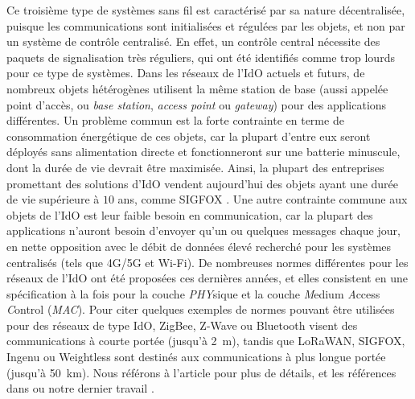 \begin{resume_fr}
Ce troisième type de systèmes sans fil est caractérisé par sa nature décentralisée,
puisque les communications sont initialisées et régulées par les objets, et non par un système de contrôle centralisé.
%
En effet, un contrôle central nécessite des paquets de signalisation très réguliers, qui ont été identifiés comme trop lourds pour ce type de systèmes.
Dans les réseaux de l'IdO actuels et futurs, de nombreux objets hétérogènes utilisent la même station de base (aussi appelée point d'accès, ou \emph{base station}, \emph{access point} ou \emph{gateway}) pour des applications différentes.
Un problème commun est la forte contrainte en terme de consommation énergétique de ces objets, car la plupart d'entre eux seront déployés sans alimentation directe et fonctionneront sur une batterie minuscule, dont la durée de vie devrait être maximisée.
Ainsi, la plupart des entreprises promettant des solutions d'IdO vendent aujourd'hui des objets ayant une durée de vie supérieure à $10$ ans, comme SIGFOX \cite{Centenaro16}.
Une autre contrainte commune aux objets de l'IdO est leur faible besoin en communication, car la plupart des applications n'auront besoin d'envoyer qu'un ou quelques messages chaque jour, en nette opposition avec le débit de données élevé recherché pour les systèmes centralisés (tels que 4G/5G et Wi-Fi).
%
De nombreuses normes différentes pour les réseaux de l'IdO ont été proposées ces dernières années,
et elles consistent en une spécification à la fois pour la couche \emph{PHY}sique
et la couche \emph{M}edium \emph{A}ccess \emph{C}ontrol (\emph{MAC}).
Pour citer quelques exemples de normes pouvant être utilisées pour des réseaux de type IdO, ZigBee, Z-Wave ou Bluetooth visent des communications à courte portée (jusqu'à \SI{2}{\meter}), tandis que LoRaWAN, SIGFOX, Ingenu ou Weightless sont destinés aux communications à plus longue portée (jusqu'à \SI{50}{\kilo\meter}).
Nous référons à l'article \cite{Centenaro16} pour plus de détails, et les références dans \cite{Azari18} ou notre dernier travail \cite{MoyBesson2019Annales}.



\end{resume_fr}
